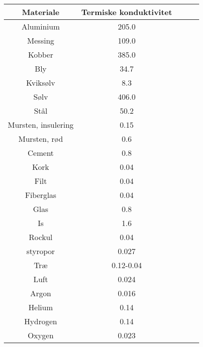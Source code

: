 \begin{tabular}{|c|c|c|c|c|}
	\hline
	Materiale&Termiske konduktivitet\\
	\hline
	Aluminium&205.0\\
	Messing&109.0\\
	Kobber&385.0\\
	Bly&34.7\\
	Kviksølv&8.3\\
	Sølv&406.0\\
	Stål&50.2\\
	Mursten, insulering&0.15\\
	Mursten, rød&0.6\\
	Cement&0.8\\
	Kork&0.04\\
	Filt&0.04\\
	Fiberglas&0.04\\
	Glas&0.8\\
	Is&1.6\\
	Rockul&0.04\\
	styropor&0.027\\
	Træ&0.12-0.04\\
	Luft&0.024\\
	Argon&0.016\\
	Helium&0.14\\
	Hydrogen&0.14\\
	Oxygen&0.023\\
	\hline
\end{tabular}
